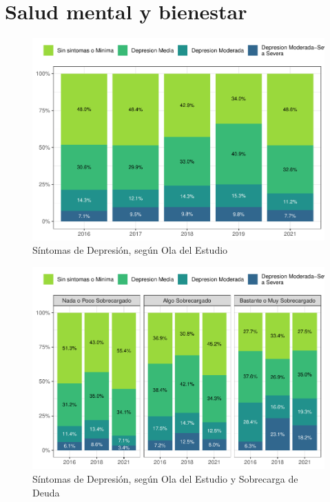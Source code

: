 \documentclass[
  12pt,
  openany]{book}
\begin{document}
\hypertarget{salud-mental-y-bienestar}{%
\chapter{Salud mental y bienestar}\label{salud-mental-y-bienestar}}

\begin{figure}

{\centering \includegraphics{reporte-elsoc_files/figure-latex/depre-wave-1} 

}

\caption{Síntomas de Depresión, según Ola del Estudio}\label{fig:depre-wave}
\end{figure}

\begin{figure}

{\centering \includegraphics{reporte-elsoc_files/figure-latex/depre-deuda-wave-1} 

}

\caption{Síntomas de Depresión, según Ola del Estudio y Sobrecarga de Deuda}\label{fig:depre-deuda-wave}
\end{figure}
\end{document}
